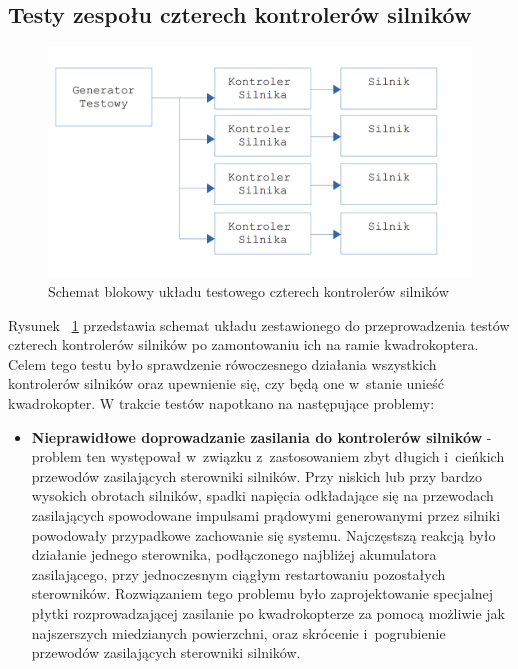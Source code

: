 \documentclass[11pt, twoside]{Thesis} %
\begin{document}
\subsection{Testy zespołu czterech kontrolerów silników}


\begin{figure}[H]
	\centering
	\includegraphics[scale=0.2]{Pictures/TestyKontroleraSilnikow_x4.png}
	\caption[Schemat blokowy układu testowego czterech kontrolerów silników]{Schemat blokowy układu testowego czterech kontrolerów silników}
	\label{fig:MotorController_test_four}
\end{figure}

Rysunek ~\ref{fig:MotorController_test_four} przedstawia schemat układu zestawionego do przeprowadzenia testów czterech kontrolerów silników po zamontowaniu ich na ramie kwadrokoptera. Celem tego testu było sprawdzenie rówoczesnego działania wszystkich kontrolerów silników oraz upewnienie się, czy będą one w~stanie unieść kwadrokopter. W trakcie testów napotkano na następujące problemy:
\begin{itemize}
	\item \textbf{Nieprawidłowe doprowadzanie zasilania do kontrolerów silników} - problem ten występował w~związku z~zastosowaniem zbyt długich i~cieńkich przewodów zasilających sterowniki silników. Przy niskich lub przy bardzo wysokich obrotach silników, spadki napięcia odkładające się na przewodach zasilających spowodowane impulsami prądowymi generowanymi przez silniki powodowały przypadkowe zachowanie się systemu. Najczęstszą reakcją było działanie jednego sterownika, podłączonego najbliżej akumulatora zasilającego, przy jednoczesnym ciągłym restartowaniu pozostałych sterowników. Rozwiązaniem tego problemu było zaprojektowanie specjalnej płytki rozprowadzającej zasilanie po kwadrokopterze za pomocą możliwie jak najszerszych miedzianych powierzchni, oraz skrócenie i~pogrubienie przewodów zasilających sterowniki silników.
\end{itemize}
\end{document}
